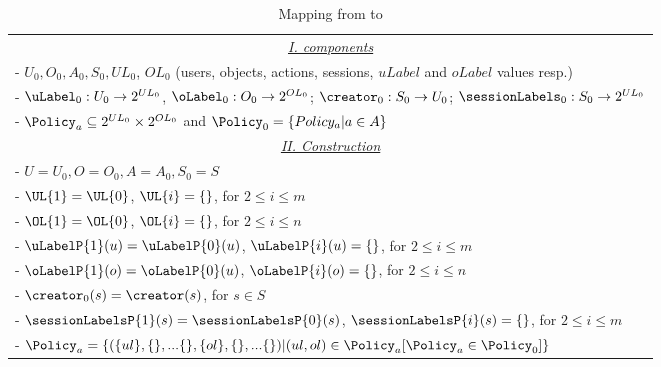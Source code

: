\renewcommand{\denom}{0}
\renewcommand{\suffix}{0}
\renewcommand{\suffixTwo}{0}
\begin{table}
	\centering
	\caption{ Mapping from \clabac{} to \EPMNModel{}  } %
	\label{tab:mapping-clabac-to-slabac}
	\begin{tabular}{|l|}						
		\hline					
			\multicolumn{1}{|c|}{\underline{\textit{I. \clabac{} components}}} \\
			-  $U_\suffix, O_\suffix,  A_\suffix, S_\suffix, UL_\suffix$, $OL_\suffix$ (users, objects, actions, sessions, $uLabel$ and $oLabel$ values resp.) \\ 				  
			-  $\uLabel_\suffix: U_\suffix \to 2^{UL_\suffix}$, $\oLabel_\suffix: O_\suffix \to 2^{OL_\suffix}$; $\creator_\suffix: S_\suffix \to U_\suffix$; $\sessionLabels_\suffix: S_\suffix \to 2^{UL_\suffix}$ \\
			- $\Policy_a \subseteq 2^{UL_\suffix} \times 2^{OL_\suffix}$ and $\Policy_\suffix = \{Policy_a | a \in A\}$\\
		   
	 \multicolumn{1}{|c|}{\underline{\textit{II. Construction}}}\\	
			- $U = U_\denom, O = O_\denom, A = A_\denom, S_\suffixTwo = S$ \\
			- $\UL{1} = \UL{0}$, $\UL{i} = \{\}$, for $2\le i \le m$\\
			- $\OL{1} = \OL{0}$, $\OL{i} = \{\}$, for $2\le i \le n$\\
			- $\uLabelP{1}(u) = \uLabelP{0}(u)$, $\uLabelP{i}(u) = \{\}$, for $2 \le i  \le m $\\
			- $\oLabelP{1}(o) = \oLabelP{0}(u)$, $\oLabelP{i}(o) = \{\}$, for $2 \le i  \le n $\\
			- $\creator_0(s) = \creator(s)$, for $s \in S$\\
			- $\sessionLabelsP{1}(s) = \sessionLabelsP{0}(s)$, $\sessionLabelsP{i}(s) = \{\}$, for $2 \le i \le m$\\
			- $\Policy_a = \{( \{ul\}, \{\}, ...\{\}, \{ol\}, \{\}, ... \{\} ) | (ul,ol) \in \Policy_a[ \Policy_a \in \Policy_\suffix]\}$\\
		 \hline	
	\end{tabular}	

	
\end{table}
